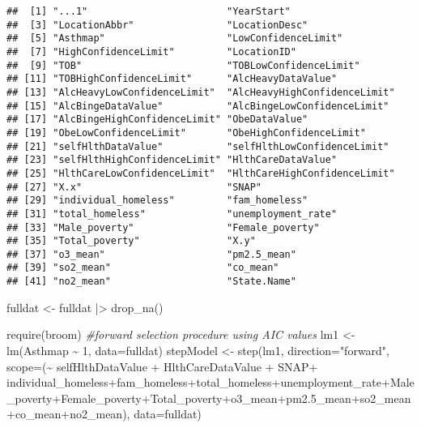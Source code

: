 \documentclass[
]{article}
\newenvironment{Shaded}{\begin{snugshade}}{\end{snugshade}}
\newcommand{\AttributeTok}[1]{\textcolor[rgb]{0.77,0.63,0.00}{#1}}
\newcommand{\CommentTok}[1]{\textcolor[rgb]{0.56,0.35,0.01}{\textit{#1}}}
\newcommand{\DecValTok}[1]{\textcolor[rgb]{0.00,0.00,0.81}{#1}}
\newcommand{\FloatTok}[1]{\textcolor[rgb]{0.00,0.00,0.81}{#1}}
\newcommand{\FunctionTok}[1]{\textcolor[rgb]{0.00,0.00,0.00}{#1}}
\newcommand{\NormalTok}[1]{#1}
\newcommand{\OtherTok}[1]{\textcolor[rgb]{0.56,0.35,0.01}{#1}}
\newcommand{\SpecialCharTok}[1]{\textcolor[rgb]{0.00,0.00,0.00}{#1}}
\newcommand{\StringTok}[1]{\textcolor[rgb]{0.31,0.60,0.02}{#1}}
\begin{document}
\begin{verbatim}
##  [1] "...1"                        "YearStart"                  
##  [3] "LocationAbbr"                "LocationDesc"               
##  [5] "Asthmap"                     "LowConfidenceLimit"         
##  [7] "HighConfidenceLimit"         "LocationID"                 
##  [9] "TOB"                         "TOBLowConfidenceLimit"      
## [11] "TOBHighConfidenceLimit"      "AlcHeavyDataValue"          
## [13] "AlcHeavyLowConfidenceLimit"  "AlcHeavyHighConfidenceLimit"
## [15] "AlcBingeDataValue"           "AlcBingeLowConfidenceLimit" 
## [17] "AlcBingeHighConfidenceLimit" "ObeDataValue"               
## [19] "ObeLowConfidenceLimit"       "ObeHighConfidenceLimit"     
## [21] "selfHlthDataValue"           "selfHlthLowConfidenceLimit" 
## [23] "selfHlthHighConfidenceLimit" "HlthCareDataValue"          
## [25] "HlthCareLowConfidenceLimit"  "HlthCareHighConfidenceLimit"
## [27] "X.x"                         "SNAP"                       
## [29] "individual_homeless"         "fam_homeless"               
## [31] "total_homeless"              "unemployment_rate"          
## [33] "Male_poverty"                "Female_poverty"             
## [35] "Total_poverty"               "X.y"                        
## [37] "o3_mean"                     "pm2.5_mean"                 
## [39] "so2_mean"                    "co_mean"                    
## [41] "no2_mean"                    "State.Name"
\end{verbatim}

\begin{Shaded}
\begin{Highlighting}[]
\NormalTok{fulldat }\OtherTok{\textless{}{-}}\NormalTok{ fulldat }\SpecialCharTok{|\textgreater{}} \FunctionTok{drop\_na}\NormalTok{()}

\FunctionTok{require}\NormalTok{(broom)}
\CommentTok{\#forward selection procedure using AIC values }
\NormalTok{lm1 }\OtherTok{\textless{}{-}} \FunctionTok{lm}\NormalTok{(Asthmap }\SpecialCharTok{\textasciitilde{}} \DecValTok{1}\NormalTok{, }\AttributeTok{data=}\NormalTok{fulldat)}
\NormalTok{stepModel }\OtherTok{\textless{}{-}} \FunctionTok{step}\NormalTok{(lm1, }\AttributeTok{direction=}\StringTok{"forward"}\NormalTok{,}
\AttributeTok{scope=}\NormalTok{(}\SpecialCharTok{\textasciitilde{}}\NormalTok{ selfHlthDataValue }\SpecialCharTok{+}\NormalTok{ HlthCareDataValue }\SpecialCharTok{+}\NormalTok{ SNAP}\SpecialCharTok{+}\NormalTok{ individual\_homeless}\SpecialCharTok{+}\NormalTok{fam\_homeless}\SpecialCharTok{+}\NormalTok{total\_homeless}\SpecialCharTok{+}\NormalTok{unemployment\_rate}\SpecialCharTok{+}\NormalTok{Male\_poverty}\SpecialCharTok{+}\NormalTok{Female\_poverty}\SpecialCharTok{+}\NormalTok{Total\_poverty}\SpecialCharTok{+}\NormalTok{o3\_mean}\SpecialCharTok{+}\NormalTok{pm2}\FloatTok{.5}\NormalTok{\_mean}\SpecialCharTok{+}\NormalTok{so2\_mean}\SpecialCharTok{+}\NormalTok{co\_mean}\SpecialCharTok{+}\NormalTok{no2\_mean), }\AttributeTok{data=}\NormalTok{fulldat)}
\end{Highlighting}
\end{Shaded}
\end{document}
